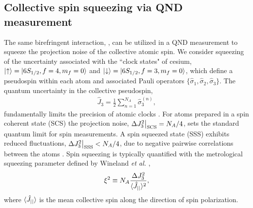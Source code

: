 \documentclass[preprint, aps,pra,onecolumn]{revtex4-1} %
\newcommand{\scs}{{\rm SCS}}
\newcommand{\varz}{\Delta J_3^2}
\newcommand{\jz}{\hat{J}_3}
\begin{document}
	\subsection{Collective spin squeezing via QND measurement}

The same birefringent interaction, , can be utilized in a QND measurement to squeeze the projection noise of the collective atomic spin.  We consider squeezing of the uncertainty associated with the ``clock states" of cesium, $\lvert{\uparrow}\rangle = \lvert{6S_{1/2}, f=4, m_f=0}\rangle$ and $\lvert{\downarrow}\rangle = \lvert{6S_{1/2}, f=3, m_f=0}\rangle$, which define a pseudospin within each atom and associated Pauli operators $\{\hat{\sigma}_1, \hat{\sigma}_2, \hat{\sigma}_3\}$.  The quantum uncertainty in the collective pseudospin,
	\begin{align}
		\jz = \frac{1}{2} \sum_{n=1}^{N_A} \hat{\sigma}_3^{(n)},  
	\end{align}
fundamentally limits the precision of atomic clocks \cite{wineland_spin_1992}. For atoms prepared in a spin coherent state (SCS) the projection noise, $\varz \big|_{\scs} = N_A/4$, sets the standard quantum limit for spin measurements. A spin squeezed state (SSS) exhibits reduced fluctuations, $ \varz \big|_{\rm SSS}  < N_A/4$, due to negative pairwise correlations between the atoms \cite{kitagawa_squeezed_1993}. Spin squeezing is typically quantified with the metrological squeezing parameter defined by Wineland \emph{et al.} \cite{wineland_spin_1992},
	\begin{align} \label{Eq::SqueezingParameter}
		\xi^2 \equiv N_A \frac{ \varz }{ \expt{\hat{J}_{||}}^2 },
	\end{align}
where $\langle{\hat{J}_{||}}\rangle$ is the mean collective spin along the direction of spin polarization. 
\end{document}
